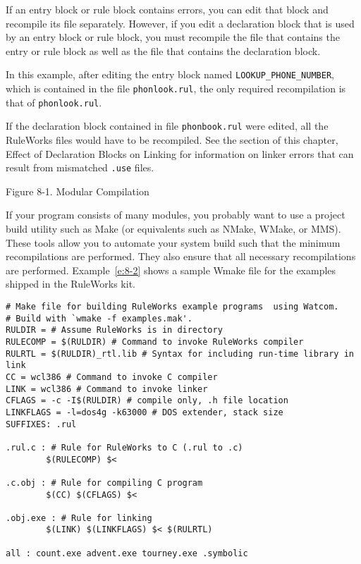 If an entry block or rule block contains errors, you can edit that
block and recompile its file separately.  However, if you edit a
declaration block that is used by an entry block or rule block, you
must recompile the file that contains the entry or rule block as well
as the file that contains the declaration block.

In this example, after editing the entry block named
\verb|LOOKUP_PHONE_NUMBER|, which is contained in the file
\verb|phonlook.rul|, the only required recompilation is that of
\verb|phonlook.rul|.

If the declaration block contained in file \verb|phonbook.rul| were
edited, all the RuleWorks files would have to be recompiled. See the
section of this chapter, Effect of Declaration Blocks on Linking for
information on linker errors that can result from mismatched
\verb|.use| files.

Figure 8-1. Modular Compilation

If your program consists of many modules, you probably want to use a
project build utility such as Make (or equivalents such as NMake,
WMake, or MMS). These tools allow you to automate your system build
such that the minimum recompilations are performed. They also ensure
that all necessary recompilations are performed. Example~\ref{e:8-2}
shows a sample Wmake file for the examples shipped in the RuleWorks
kit.

\begin{exampl}
\begin{verbatim}
# Make file for building RuleWorks example programs  using Watcom.
# Build with `wmake -f examples.mak'.
RULDIR = # Assume RuleWorks is in directory
RULECOMP = $(RULDIR) # Command to invoke RuleWorks compiler
RULRTL = $(RULDIR)_rtl.lib # Syntax for including run-time library in link
CC = wcl386 # Command to invoke C compiler
LINK = wcl386 # Command to invoke linker
CFLAGS = -c -I$(RULDIR) # compile only, .h file location
LINKFLAGS = -l=dos4g -k63000 # DOS extender, stack size
SUFFIXES: .rul

.rul.c : # Rule for RuleWorks to C (.rul to .c)
        $(RULECOMP) $<

.c.obj : # Rule for compiling C program
        $(CC) $(CFLAGS) $<

.obj.exe : # Rule for linking
        $(LINK) $(LINKFLAGS) $< $(RULRTL)

all : count.exe advent.exe tourney.exe .symbolic
\end{verbatim}
\label{e:8-2}
\end{exampl}

